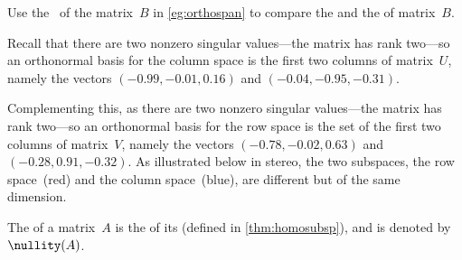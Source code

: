 \begin{example} 
Use the \svd\ of the matrix~\(B\) in \cref{eg:orthospan} to compare the  and the  of matrix~\(B\).
\begin{solution} 
Recall that there are two nonzero singular values---the matrix has rank two---so an orthonormal basis for the column space is  the first two columns of matrix~\(U\), namely the vectors  \((-0.99,-0.01,0.16)\) and \((-0.04,-0.95,-0.31)\).

Complementing this, as there are two nonzero singular values---the matrix has rank two---so an orthonormal basis for the row space is the set of the first two columns of matrix~\(V\), namely the vectors  \((-0.78,-0.02, 0.63)\) and \((-0.28, 0.91,-0.32)\).
As illustrated below in stereo, the two subspaces, the row space~(red) and the column space~(blue), are different but of the same dimension.
\begin{center}
\end{center}
\end{solution}
\end{example}




\begin{definition} \label{def:nullity} 
The  of a matrix~\(A\) is the  of its  (defined in \cref{thm:homosubsp}), and is denoted by \(\nullity(A)\).
\end{definition}

